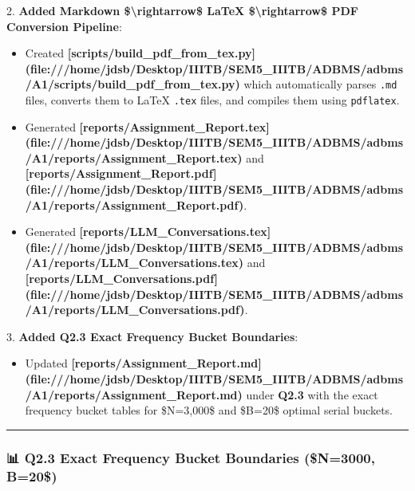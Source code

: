 \documentclass[11pt,a4paper]{article}
\begin{document}
{2. \textbf{Added Markdown \$\textbackslash{}rightarrow\$ LaTeX \$\textbackslash{}rightarrow\$ PDF Conversion Pipeline}:

\begin{itemize}
\item Created \textbf{[scripts/build\_pdf\_from\_tex.py](file:///home/jdsb/Desktop/IIITB/SEM5\_IIITB/ADBMS/adbms/A1/scripts/build\_pdf\_from\_tex.py)} which automatically parses \texttt{.md} files, converts them to LaTeX \texttt{.tex} files, and compiles them using \texttt{pdflatex}.
\item Generated \textbf{[reports/Assignment\_Report.tex](file:///home/jdsb/Desktop/IIITB/SEM5\_IIITB/ADBMS/adbms/A1/reports/Assignment\_Report.tex)} and \textbf{[reports/Assignment\_Report.pdf](file:///home/jdsb/Desktop/IIITB/SEM5\_IIITB/ADBMS/adbms/A1/reports/Assignment\_Report.pdf)}.
\item Generated \textbf{[reports/LLM\_Conversations.tex](file:///home/jdsb/Desktop/IIITB/SEM5\_IIITB/ADBMS/adbms/A1/reports/LLM\_Conversations.tex)} and \textbf{[reports/LLM\_Conversations.pdf](file:///home/jdsb/Desktop/IIITB/SEM5\_IIITB/ADBMS/adbms/A1/reports/LLM\_Conversations.pdf)}.
\end{itemize}

3. \textbf{Added Q2.3 Exact Frequency Bucket Boundaries}:

\begin{itemize}
\item Updated \textbf{[reports/Assignment\_Report.md](file:///home/jdsb/Desktop/IIITB/SEM5\_IIITB/ADBMS/adbms/A1/reports/Assignment\_Report.md)} under \textbf{Q2.3} with the exact frequency bucket tables for \$N=3,000\$ and \$B=20\$ optimal serial buckets.
\end{itemize}

\hrule


\subsubsection{📊 Q2.3 Exact Frequency Bucket Boundaries (\$N=3000, B=20\$)}

}
\end{document}
